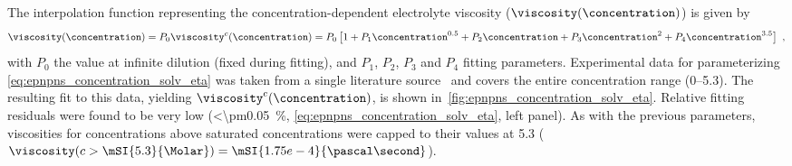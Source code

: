 The interpolation function representing the concentration-dependent electrolyte viscosity ($\viscosity
(\concentration)$) is given by
%
\begin{align}\label{eq:epnpns_concentration_solv_eta}
  \viscosity (\concentration) = P_0 \viscosity^c (\concentration) =
  P_0 \left[ 1
            + P_1 \concentration^{0.5}
            + P_2 \concentration
            + P_3 \concentration^{2}
            + P_4 \concentration^{3.5}
      \right]
  \text{ ,}
\end{align}
%
with $P_0$ the value at infinite dilution (fixed during fitting), and $P_1$, $P_2$, $P_3$ and $P_4$ fitting
parameters. Experimental data for parameterizing \cref{eq:epnpns_concentration_solv_eta} was taken from a
single literature source~\cite{Hai-Lang-1996} and covers the entire concentration range
(\SIrange{0}{5.3}{\Molar}). The resulting fit to this data, yielding $\viscosity^c (\concentration)$, is shown
in~\cref{fig:epnpns_concentration_solv_eta}. Relative fitting residuals were found to be very low
(\SI{<\pm0.05}{\percent}, \cref{eq:epnpns_concentration_solv_eta}, left panel). As with the previous
parameters, viscosities for concentrations above saturated concentrations were capped to their values at
\SI{5.3}{\Molar} (\ie~$\viscosity (c > \mSI{5.3}{\Molar}) = \mSI{1.75e-4}{\pascal\second}$).

